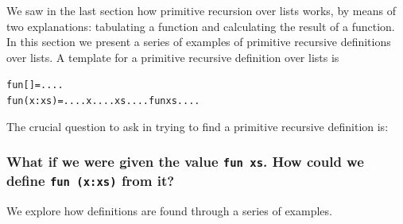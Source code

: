 We saw in the last section how primitive recursion over lists works, by means of two 
explanations: tabulating a function and calculating the result of a function.
In this section we present a series of examples of primitive recursive definitions 
over lists. A template for a primitive recursive definition over lists is
\begin{alltt}
fun []     = ....
fun (x:xs) = .... x .... xs .... fun xs ....
\end{alltt}
The crucial question to ask in trying to find a primitive
recursive definition is:

\subsubsection*{{\bfseries What if\/} we were given the
value 
{\tt fun xs}. How could we define {\tt fun (x:xs)} from
it?}


We explore how definitions are found through a series of examples.

